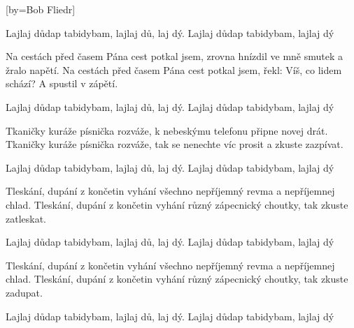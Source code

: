 [by={Bob Fliedr}]

\beginchorus{}
\lrep{} Lajlaj důdap tabidybam, lajlaj dů, laj dý.
Lajlaj důdap tabidybam, lajlaj dý \rrep{}
\endchorus{}

\beginverse{}
Na cestách před časem Pána cest potkal jsem,
zrovna hnízdil ve mně smutek a žralo napětí.
Na cestách před časem Pána cest potkal jsem,
řekl: Víš, co lidem schází? A spustil v zápětí.
\endverse{}

\beginchorus{}
\lrep{} Lajlaj důdap tabidybam, lajlaj dů, laj dý.
Lajlaj důdap tabidybam, lajlaj dý \rrep{}
\endchorus{}

\beginverse{}
Tkaničky kuráže písnička rozváže,
k nebeskýmu telefonu připne novej drát.
Tkaničky kuráže písnička rozváže,
tak se nenechte víc prosit a zkuste zazpívat.
\endverse{}

\beginchorus{}
\lrep{} Lajlaj důdap tabidybam, lajlaj dů, laj dý.
Lajlaj důdap tabidybam, lajlaj dý \rrep{}
\endchorus{}

\beginverse{}
Tleskání, dupání z končetin vyhání
všechno nepříjemný revma a nepříjemnej chlad.
Tleskání, dupání z končetin vyhání
různý zápecnický choutky, tak zkuste zatleskat.
\endverse{}

\beginchorus{}
\lrep{} Lajlaj důdap tabidybam, lajlaj dů, laj dý.
Lajlaj důdap tabidybam, lajlaj dý \rrep{}
\endchorus{}

\beginverse{}
Tleskání, dupání z končetin vyhání
všechno nepříjemný revma a nepříjemnej chlad.
Tleskání, dupání z končetin vyhání
různý zápecnický choutky, tak zkuste zadupat.
\endverse{}

\beginchorus{}
\lrep{} Lajlaj důdap tabidybam, lajlaj dů, laj dý.
Lajlaj důdap tabidybam, lajlaj dý \rrep{}
\endchorus{}

\endsong{}
